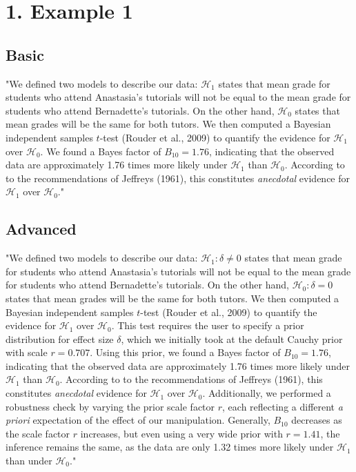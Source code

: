 \documentclass[11pt]{article}
\date{}
\title{}
\begin{document}
\section*{1. Example 1}
\label{sec:orgc6f78dd}
\subsection*{Basic}
\label{sec:org0f3eff4}
"We defined two models to describe our data: \(\mathcal{H}_1\) states that mean grade for students who attend Anastasia's tutorials will not be equal to the mean grade for students who attend Bernadette's tutorials. On the other hand, \(\mathcal{H}_0\) states that mean grades will be the same for both tutors. We then computed a Bayesian independent samples \(t\)-test (Rouder et al., 2009) to quantify the evidence for \(\mathcal{H}_1\) over \(\mathcal{H}_0\).  We found a Bayes factor of \(B_{10}=1.76\), indicating that the observed data are approximately 1.76 times more likely under \(\mathcal{H}_1\) than \(\mathcal{H}_0\). According to to the recommendations of Jeffreys (1961), this constitutes \emph{anecdotal} evidence for \(\mathcal{H}_1\) over \(\mathcal{H}_0\)."

\subsection*{Advanced}
\label{sec:org6871467}
"We defined two models to describe our data: \(\mathcal{H}_1: \delta \neq 0\) states that mean grade for students who attend Anastasia's tutorials will not be equal to the mean grade for students who attend Bernadette's tutorials. On the other hand, \(\mathcal{H}_0:\delta=0\) states that mean grades will be the same for both tutors. We then computed a Bayesian independent samples \(t\)-test (Rouder et al., 2009) to quantify the evidence for \(\mathcal{H}_1\) over \(\mathcal{H}_0\). This test requires the user to specify a prior distribution for effect size \(\delta\), which we initially took at the default Cauchy prior with scale \(r=0.707\). Using this prior, we found a Bayes factor of \(B_{10}=1.76\), indicating that the observed data are approximately 1.76 times more likely under \(\mathcal{H}_1\) than \(\mathcal{H}_0\).  According to to the recommendations of Jeffreys (1961), this constitutes \emph{anecdotal} evidence for \(\mathcal{H}_1\) over \(\mathcal{H}_0\). Additionally, we performed a robustness check by varying the prior scale factor \(r\), each reflecting a different \emph{a priori} expectation of the effect of our manipulation. Generally, \(B_{10}\) decreases as the scale factor \(r\) increases, but even using a very wide prior with \(r=1.41\), the inference remains the same, as the data are only 1.32 times more likely under \(\mathcal{H}_1\) than under \(\mathcal{H}_0\)."
\end{document}
